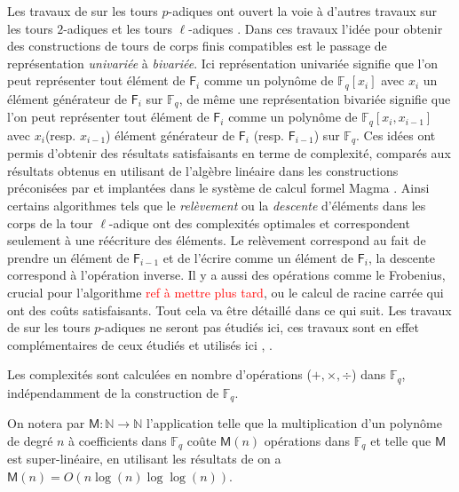 \documentclass[10pt,a4paper]{book}
\theoremstyle{plain}
\theoremstyle{definition}
\theoremstyle{definition}
\theoremstyle{definition}
\theoremstyle{definition}
\theoremstyle{remark}
\theoremstyle{remark}
\begin{document}
Les travaux de \cite{DeFeo-Shost'12} sur les tours $p$-adiques ont ouvert la voie à d'autres travaux sur les tours $2$-adiques \cite{Doliskani-Schost15} et les tours $\ell$-adiques \cite{DeFeo-Doliskani-Schost13}. Dans ces travaux l'idée pour obtenir des constructions de tours de corps finis compatibles est le passage de représentation \textit{univariée} à \textit{bivariée}. Ici représentation univariée signifie que l'on peut représenter tout élément de $\mathsf{F}_i$ comme un polynôme de $\mathbb{F}_q[x_i]$ avec $x_i$ un élément générateur de $\mathsf{F}_i$ sur $\mathbb{F}_q$, de même une représentation bivariée signifie que l'on peut représenter tout élément de $\mathsf{F}_i$ comme un polynôme de $\mathbb{F}_q[x_i, x_{i-1}]$ avec $x_i$(resp. $x_{i-1}$) élément générateur de $\mathsf{F}_i$ (resp. $\mathsf{F}_{i-1}$) sur $\mathbb{F}_q$. Ces idées ont permis d'obtenir des résultats satisfaisants en terme de complexité, comparés aux résultats obtenus en utilisant de l'algèbre linéaire dans les constructions préconisées par \cite{BosmaCS97} et implantées dans le système de calcul formel Magma \cite{magma97}. Ainsi certains algorithmes tels que le \textit{relèvement} ou la \textit{descente} d'éléments dans les corps de la tour $\ell$-adique ont des complexités optimales et correspondent seulement à une réécriture des éléments. Le relèvement correspond au fait de prendre un élément de $\mathsf{F}_{i-1}$ et de l'écrire comme un élément de $\mathsf{F}_i$, la descente correspond à l'opération inverse. Il y a aussi des opérations comme le Frobenius, crucial pour l'algorithme \textcolor{red}{ref à mettre plus tard}, ou le calcul de racine carrée qui ont des coûts satisfaisants. Tout cela va être détaillé dans ce qui suit. Les travaux de  \cite{DeFeo-Shost'12} sur les tours $p$-adiques ne seront pas étudiés ici, ces travaux sont en effet complémentaires de ceux étudiés et utilisés ici \cite{Doliskani-Schost15}, \cite{DeFeo-Doliskani-Schost13}.

Les complexités sont calculées en nombre d'opérations ($+, \times,\div$) dans $\mathbb{F}_q$, indépendamment de la construction de $\mathbb{F}_q$. 

On notera par $\mathsf{M}: \mathbb{N} \rightarrow \mathbb{N}$ l'application telle que la multiplication d'un polynôme de degré $n$ à coefficients dans $\mathbb{F}_q$ coûte $\mathsf{M}(n)$ opérations dans $\mathbb{F}_q$ et telle que $\mathsf{M}$ est super-linéaire, en utilisant les résultats de \cite{Cantor-Kaltofen91} on a $\mathsf{M}(n)=O(n\log(n) \log \log(n))$. 
\end{document}
